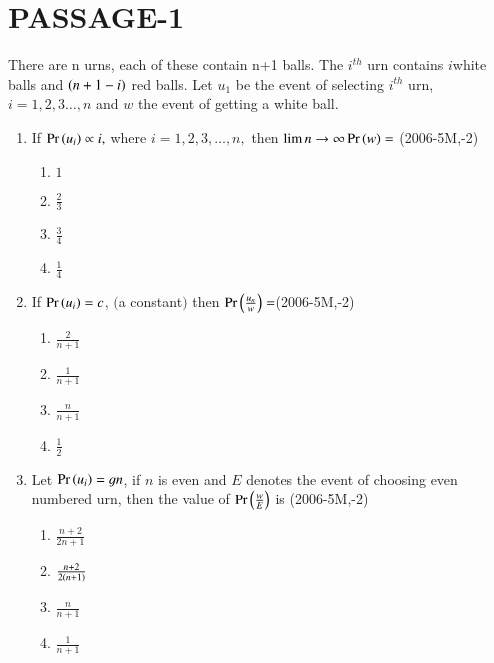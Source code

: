 \documentclass[journal,12pt,onecolumn,article]{IEEEtran}
\theoremstyle{remark}
\begin{document}
\section*{PASSAGE-1}
There are n urns, each of these contain n+1 balls. The $i^{th}$ urn contains $i$white balls and $\left(n+1-i\right)$ red balls. Let $u_1$ be the event of selecting $i^{th}$ urn, $i=1,2,3\dots,n$ and $w$ the event of getting a white ball.
\begin{enumerate}
	\item If $\Pr\left(u_i\right)\propto i,$ where $i=1,2,3,\dots,n,$ then $\lim{n \to \infty} \Pr\left(w\right)=$ \hfill(2006-5M,-2)
		\begin{enumerate}
					\item $1$
					\item $\frac{2}{3}$
					\item $\frac{3}{4}$
					\item $\frac{1}{4}$
		\end{enumerate}
	\item If $\Pr\left(u_i\right)=c$, $($a constant$)$ then $\Pr\left(\frac{u_n}{w}\right)=$\hfill(2006-5M,-2)
		\begin{enumerate}
				\item $\frac{2}{n+1}$
				\item $\frac{1}{n+1}$
				\item $\frac{n}{n+1}$
				\item $\frac{1}{2}$
		\end{enumerate}
	\item Let $\Pr\left(u_i\right)=\frak{1}{n}$, if $n$ is even and $E$ denotes the event of choosing even numbered urn, then the value of $\Pr\left(\frac{w}{E}\right)$ is \hfill(2006-5M,-2)
		\begin{enumerate}
				\item $\frac{n+2}{2n+1}$
				\item $\frac{n+2}{2\left(n+1\right)}$
				\item $\frac{n}{n+1}$
				\item $\frac{1}{n+1}$
		\end{enumerate}

\end{enumerate}
\end{document}
